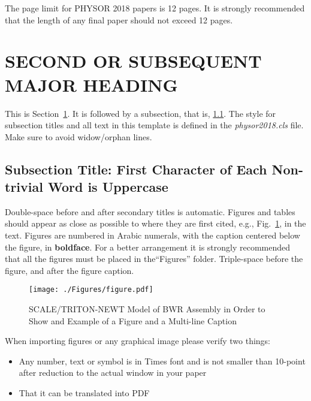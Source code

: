 \documentclass[letterpaper]{physor2018}
\begin{document}
The page limit for PHYSOR 2018 papers is 12 pages. It is strongly recommended that 
the length of any final paper should not exceed 12 pages.

\section{SECOND OR SUBSEQUENT MAJOR HEADING} 
\label{sec:first}

This is Section~\ref{sec:first}. It is followed by a subsection, that is, 
\ref{sec:second}. The style for subsection titles and all text in this template is defined 
in the \emph{physor2018.cls} file.  Make sure to avoid widow/orphan lines.

\subsection{Subsection Title: First Character of Each Non-trivial Word is Uppercase} 
\label{sec:second}

Double-space before and after secondary titles is automatic.  Figures and 
tables should appear as close as possible to where they are first
cited, e.g., Fig.~\ref{fig:amdahl}, in the text.  Figures are numbered in Arabic 
numerals, with the caption centered below the figure, in \textbf{boldface}. For a better 
arrangement it is strongly recommended that all the figures must be placed in the``Figures'' 
folder. Triple-space before the figure, and after the figure caption.

\begin{figure}[!htb]
  \centering
  \texttt{[image: ./Figures/figure.pdf]}
  \caption{SCALE/TRITON-NEWT Model of BWR Assembly in Order to Show and Example of a Figure and a Multi-line Caption}   
  \label{fig:amdahl}
\end{figure}

When importing figures or any graphical image please verify two things:
\vspace{-0.65cm} %
\begin{itemize} \itemsep1pt \parskip0pt 
\item Any number, text or symbol is in Times font and is not smaller than 
  10-point after reduction to the actual window in your paper
\item That it can be translated into PDF
\end{itemize}
\end{document}
